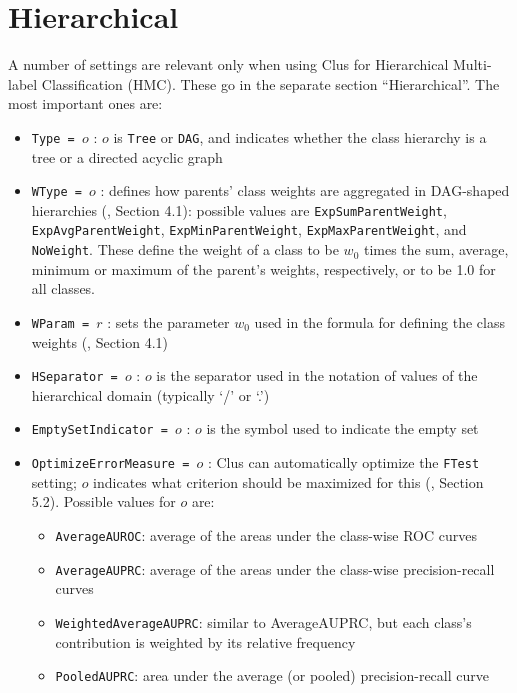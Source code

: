 \documentclass[a4paper]{report}
\begin{document}
\section{Hierarchical}

A number of settings are relevant only when using Clus for Hierarchical Multi-label Classification (HMC).  These go in the separate section ``Hierarchical''.  The most important ones are:

\begin{itemize}
\item {\tt Type = $o$} : $o$ is {\tt Tree} or {\tt DAG}, and indicates whether the class hierarchy is a tree or a directed acyclic graph \cite{hmc-paper}
\item {\tt WType = $o$} : defines how parents' class weights are aggregated in DAG-shaped hierarchies (\cite{Vens08:jrnl}, Section 4.1): possible values are {\tt ExpSumParentWeight}, {\tt ExpAvgParentWeight}, {\tt ExpMinParentWeight}, {\tt ExpMaxParentWeight}, and {\tt NoWeight}.  These define the weight of a class to be $w_0$ times the sum, average, minimum or maximum of the parent's weights, respectively, or to be 1.0 for all classes. 
\item {\tt WParam = $r$} : sets the parameter $w_0$ used in the formula for defining the class weights (\cite{Vens08:jrnl}, Section 4.1)
\item {\tt HSeparator = $o$} : $o$ is the separator used in the notation of values of the hierarchical domain (typically `/' or `.') 
\item {\tt EmptySetIndicator = $o$} : $o$ is the symbol used to indicate the empty set
\item {\tt OptimizeErrorMeasure = $o$} : Clus can automatically optimize the {\tt FTest} setting; $o$ indicates what criterion should be maximized for this (\cite{Vens08:jrnl}, Section 5.2).  Possible values for $o$ are:
  \begin{itemize}
   \item {\tt AverageAUROC}: average of the areas under the class-wise ROC curves
   \item {\tt AverageAUPRC}: average of the areas under the class-wise precision-recall curves
   \item {\tt WeightedAverageAUPRC}: similar to AverageAUPRC, but each class's contribution is                         weighted by its relative frequency
   \item {\tt PooledAUPRC}: area under the average (or pooled) precision-recall curve
  \end{itemize}

\end{itemize}
\end{document}
